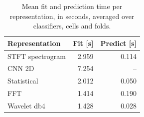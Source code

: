 \begin{table}[htbp]
\centering
\caption{Mean fit and prediction time per representation, in seconds, averaged over classifiers, cells and folds.}
\label{tab:costo}
\begin{tabular}{lrr}
\toprule
Representation & Fit [s] & Predict [s] \\
\midrule
STFT spectrogram & 2.959 & 0.114 \\
CNN 2D & 7.254 & -- \\
Statistical & 2.012 & 0.050 \\
FFT & 1.414 & 0.190 \\
Wavelet db4 & 1.428 & 0.028 \\
\bottomrule
\end{tabular}
\end{table}
